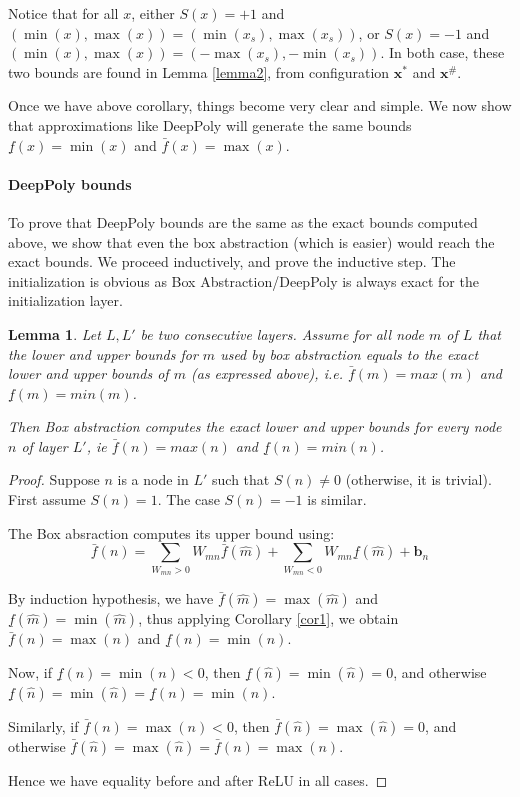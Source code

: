 \documentclass[]{article}
\newtheorem{lemma}{Lemma}
\theoremstyle{definition}
\begin{document}
	
	Notice that for all $x$, either $S(x)=+1$ and 
	$(\min(x),\max(x))=(\min(x_s),\max(x_s))$, 
	or $S(x)=-1$ and $(\min(x),\max(x))=(-\max(x_s),-\min(x_s))$.
	In both case, these two bounds are found in Lemma \ref{lemma2},
	from configuration $\boldsymbol{x}^*$ and $\boldsymbol{x}^\#$.
	
	
	
	Once we have above corollary, things become very clear and simple. We now show that approximations like DeepPoly will generate the same bounds 
	$\underline{f}(x)=\min(x)$ and $\bar{f}(x)=\max(x)$.
	
	\paragraph{DeepPoly bounds}
	
	To prove that DeepPoly bounds are the same as the exact bounds computed above, 
	we show that even the box abstraction (which is easier) would reach the exact bounds.
	We proceed inductively, and prove the inductive step.
	The initialization is obvious as Box Abstraction/DeepPoly is always exact for the initialization layer.
	
	\begin{lemma}
		Let $L,L'$ be two consecutive layers.
		Assume for all node $m$ of $L$ that the lower and upper bounds for $m$ used by box abstraction equals to the exact lower and upper bounds of $m$ (as expressed above), i.e.
		$\bar{f}(m)=max(m)$ and $\underline{f}(m)=min(m)$.
		
		Then Box abstraction computes the exact lower and upper bounds for every node $n$ of layer $L'$, ie $\bar{f}(n)=max(n)$ and $\underline{f}(n)=min(n)$.
	\end{lemma}
	
	\begin{proof}
		Suppose $n$ is a node in $L'$ such that $S(n)\neq 0$ (otherwise, it is trivial). 
		First assume $S(n)=1$. The case $S(n)=-1$ is similar. 
		
		The Box absraction computes its upper bound using:
		$$\bar{f}(n)= \sum_{W_{mn}>0} W_{mn} \bar{f}(\hat{m}) + \sum_{W_{mn}<0} W_{mn} \underline{f}(\hat{m}) + \boldsymbol{b}_n$$
		
		By induction hypothesis, we have 
		$\bar{f}(\hat{m})=\max(\hat{m})$ and
		$\underline{f}(\hat{m})=\min(\hat{m})$, thus 
		applying Corollary \ref{cor1}, we obtain
		$\bar{f}(n)=\max(n)$ and 
		$\underline{f}(n)=\min(n)$.
		
		Now, if $\underline{f}(n)=\min(n)<0$, 
		then $\underline{f}(\hat{n})=\min(\hat{n})=0$, 
		and otherwise 
		$\underline{f}(\hat{n})=\min(\hat{n})=\underline{f}(n)=\min(n)$.
		
		Similarly, 
		if $\bar{f}(n)=\max(n)<0$, 
		then $\bar{f}(\hat{n})=\max(\hat{n})=0$, 
		and otherwise 
		$\bar{f}(\hat{n})=\max(\hat{n})=\bar{f}(n)=\max(n)$.
		
		Hence we have equality before and after ReLU in all cases.
	\end{proof}
	
\end{document}
